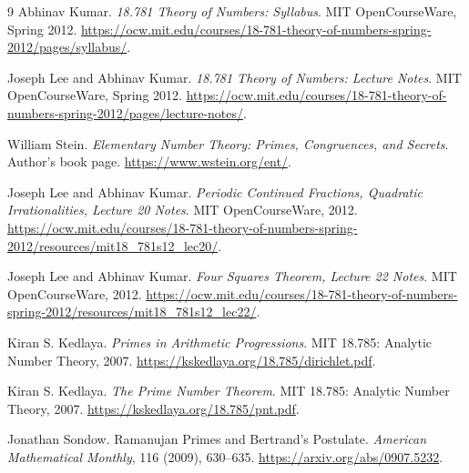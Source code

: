 \documentclass[UTF8,12pt,a4paper,fontset=fandol]{ctexbook}
\begin{document}
\backmatter

\begin{thebibliography}{9}
  Abhinav Kumar.
  \emph{18.781 Theory of Numbers: Syllabus}.
  MIT OpenCourseWare, Spring 2012.
  \url{https://ocw.mit.edu/courses/18-781-theory-of-numbers-spring-2012/pages/syllabus/}.

  Joseph Lee and Abhinav Kumar.
  \emph{18.781 Theory of Numbers: Lecture Notes}.
  MIT OpenCourseWare, Spring 2012.
  \url{https://ocw.mit.edu/courses/18-781-theory-of-numbers-spring-2012/pages/lecture-notes/}.

  William Stein.
  \emph{Elementary Number Theory: Primes, Congruences, and Secrets}.
  Author's book page.
  \url{https://www.wstein.org/ent/}.

  Joseph Lee and Abhinav Kumar.
  \emph{Periodic Continued Fractions, Quadratic Irrationalities, Lecture 20 Notes}.
  MIT OpenCourseWare, 2012.
  \url{https://ocw.mit.edu/courses/18-781-theory-of-numbers-spring-2012/resources/mit18_781s12_lec20/}.

  Joseph Lee and Abhinav Kumar.
  \emph{Four Squares Theorem, Lecture 22 Notes}.
  MIT OpenCourseWare, 2012.
  \url{https://ocw.mit.edu/courses/18-781-theory-of-numbers-spring-2012/resources/mit18_781s12_lec22/}.

  Kiran S. Kedlaya.
  \emph{Primes in Arithmetic Progressions}.
  MIT 18.785: Analytic Number Theory, 2007.
  \url{https://kskedlaya.org/18.785/dirichlet.pdf}.

  Kiran S. Kedlaya.
  \emph{The Prime Number Theorem}.
  MIT 18.785: Analytic Number Theory, 2007.
  \url{https://kskedlaya.org/18.785/pnt.pdf}.

  Jonathan Sondow.
  Ramanujan Primes and Bertrand's Postulate.
  \emph{American Mathematical Monthly}, 116 (2009), 630--635.
  \url{https://arxiv.org/abs/0907.5232}.
\end{thebibliography}
\end{document}
